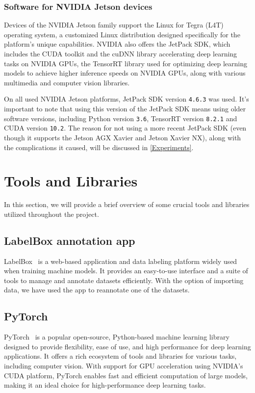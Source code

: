 \subsubsection{Software for NVIDIA Jetson devices}

Devices of the NVIDIA Jetson family support the Linux for Tegra (L4T) operating
system, a customized Linux distribution designed specifically for the platform's
unique capabilities. NVIDIA also offers the JetPack SDK, which includes the
CUDA toolkit and the cuDNN library accelerating deep learning tasks on NVIDIA
GPUs, the TensorRT library used for optimizing deep learning models to achieve
higher inference speeds on NVIDIA GPUs, along with various multimedia and
computer vision libraries.

On all used NVIDIA Jetson platforms, JetPack SDK version \texttt{4.6.3} was
used. It's important to note that using this version of the JetPack SDK means
using older software versions, including Python version \texttt{3.6}, TensorRT
version \texttt{8.2.1} and CUDA version \texttt{10.2}. The reason for not using
a more recent JetPack SDK (even though it supports the Jetson AGX Xavier and
Jetson Xavier NX), along with the complications it caused, will be discussed in
\autoref{Experiments}.


\section{Tools and Libraries}

In this section, we will provide a brief overview of some crucial tools and
libraries utilized throughout the project.


\subsection{LabelBox annotation app}

LabelBox~\cite{LabelBox} is a web-based application and data labeling platform
widely used when training machine models. It provides an easy-to-use interface
and a suite of tools to manage and annotate datasets efficiently. With the
option of importing data, we have used the app to reannotate one of the
datasets.


\subsection{PyTorch}

PyTorch~\cite{PyTorch} is a popular open-source, Python-based machine learning
library designed to provide flexibility, ease of use, and high performance for
deep learning applications. It offers a rich ecosystem of tools and libraries for
various tasks, including computer vision. With support for GPU acceleration
using NVIDIA's CUDA platform, PyTorch enables fast and efficient computation of
large models, making it an ideal choice for high-performance deep learning
tasks.

